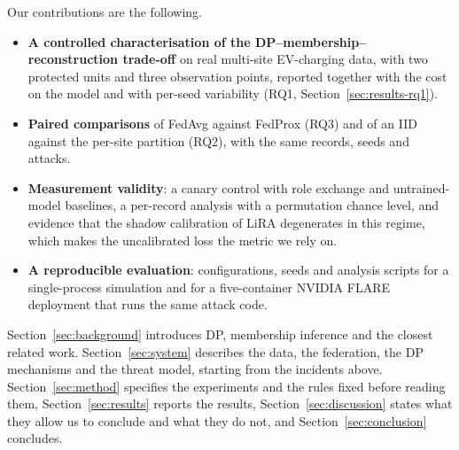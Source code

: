 Our contributions are the following.

\begin{itemize}
\item \textbf{A controlled characterisation of the DP--membership--reconstruction
trade-off} on real multi-site EV-charging data, with two protected units and
three observation points, reported together with the cost on the model and
with per-seed variability (RQ1, Section~\ref{sec:results-rq1}).

\item \textbf{Paired comparisons} of FedAvg against FedProx (RQ3) and of an
IID against the per-site partition (RQ2), with the same records, seeds and
attacks. 

\item \textbf{Measurement validity}: a canary control with role exchange and
untrained-model baselines, a per-record analysis with a permutation chance
level, and evidence that the shadow calibration of LiRA degenerates in this
regime, which makes the uncalibrated loss the metric we rely on.

\item \textbf{A reproducible evaluation}: configurations, seeds and analysis
scripts for a single-process simulation and for a five-container NVIDIA FLARE
deployment that runs the same attack code.
\end{itemize}

Section~\ref{sec:background} introduces DP, membership inference and the
closest related work. Section~\ref{sec:system} describes the data, the
federation, the DP mechanisms and the threat model, starting from the
incidents above. Section~\ref{sec:method} specifies the experiments and the
rules fixed before reading them, Section~\ref{sec:results} reports the
results, Section~\ref{sec:discussion} states what they allow us to conclude and
what they do not, and Section~\ref{sec:conclusion} concludes.
